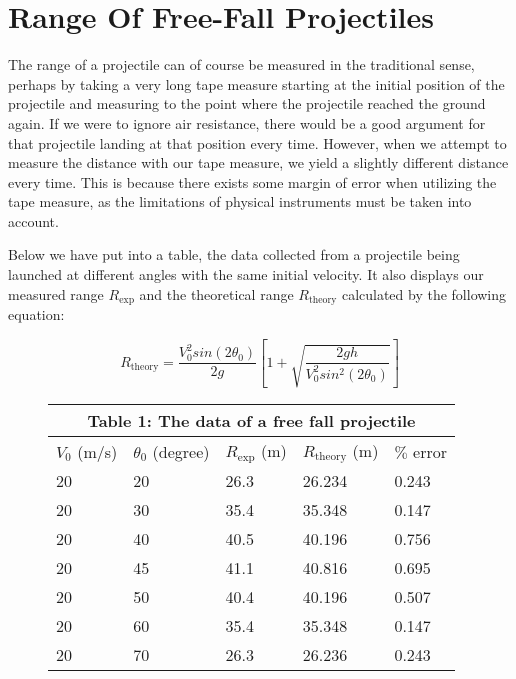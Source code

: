 \documentclass[12pt]{article}
\begin{document}
\section{Range Of Free-Fall Projectiles}
The range of a projectile can of course be measured in the traditional sense, perhaps by taking a very long tape measure starting at the initial position of the projectile and measuring to the point where the projectile reached the ground again. If we were to ignore air resistance, there would be a good argument for that projectile landing at that position every time. However, when we attempt to measure the distance with our tape measure, we yield a slightly different distance every time. This is because there exists some margin of error when utilizing the tape measure, as the limitations of physical instruments must be taken into account.

Below we have put into a table, the data collected from a projectile being launched at different angles with the same initial velocity. It also displays our measured range $R_\text{exp}$ and the theoretical range $R_\text{theory}$ calculated by the following equation:

\[R_\text{theory} = \frac{V_0^2sin(2 \theta_0)}{2g} \left[1+\sqrt{\frac{2gh}{V_0^2sin^2(2 \theta_0)}} \right]\]

\setlength{\tabcolsep}{5pt}
\renewcommand{\arraystretch}{1.4}

\begin{figure}[H]
    \centering
    \begin{tabular}{ p{2cm}p{2cm}p{2cm}p{2cm}p{2cm} }
        \hline
        \multicolumn{5}{c}{Table 1: The data of a free fall projectile} \\
        \hline
        $V_0$ (m/s) & $\theta_0$ (degree) & $R_\text{exp}$ (m) & $R_\text{theory}$ (m) & $\%$ error \\
        \hline
        20 & 20 & 26.3 & 26.234 & 0.243 \\
        20 & 30 & 35.4 & 35.348 & 0.147 \\
        20 & 40 & 40.5 & 40.196 & 0.756 \\
        20 & 45 & 41.1 & 40.816 & 0.695 \\
        20 & 50 & 40.4 & 40.196 & 0.507 \\
        20 & 60 & 35.4 & 35.348 & 0.147 \\
        20 & 70 & 26.3 & 26.236 & 0.243 \\
        \hline
    \end{tabular}
\end{figure}
\end{document}
